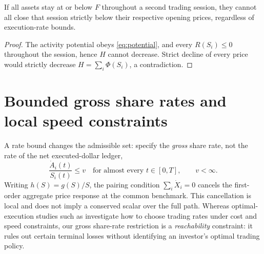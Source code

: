 \documentclass[review,hidelinks,onefignum,onetabnum]{siamonline250211}%
\begin{document}
\begin{proposition}\label{prop:second}
If all assets stay at or below $F$ throughout a second trading session,
they cannot all close that session strictly below their respective
opening prices, regardless of execution-rate bounds.
\end{proposition}
\begin{proof}
The activity potential obeys \eqref{eq:potential}, and every
$R(S_i)\le0$ throughout the session, hence $H$ cannot decrease.
Strict decline of every price would strictly decrease
$H=\sum_i\Phi(S_i)$, a contradiction.
\end{proof}


\section{Bounded gross share rates and local speed constraints}
\label{sec:rates}
A rate bound changes the admissible set: specify the \emph{gross}
share rate, not the rate of the net executed-dollar ledger,
\begin{equation}\label{eq:grossrate}
 \frac{\dot A_i(t)}{S_i(t)}\le v
 \quad\text{for almost every }t\in[0,T],\qquad v<\infty.
\end{equation}
Writing $h(S)=g(S)/S$, the pairing condition
$\sum_i\dot X_i=0$ cancels the first-order aggregate price
response at the common benchmark. This cancellation is local and
does not imply a conserved scalar over the full path.
Whereas optimal-execution studies such as
\citet{AlmgrenChriss2001,Yang2019} investigate how to choose
trading rates under cost and speed constraints, our gross
share-rate restriction is a \emph{reachability} constraint:
it rules out certain terminal losses without identifying an
investor's optimal trading policy.
\end{document}
